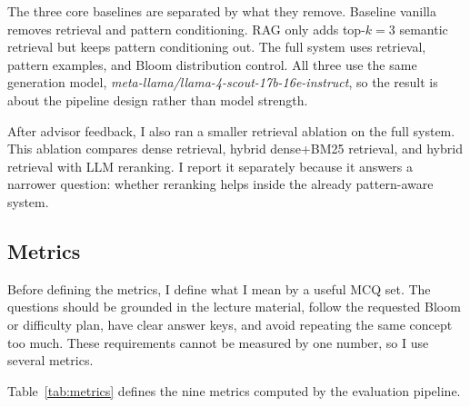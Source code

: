 \documentclass[12pt,a4paper]{article}
\begin{document}
The three core baselines are separated by what they remove. Baseline
vanilla removes retrieval and pattern conditioning. RAG only adds top-$k=3$
semantic retrieval but keeps pattern conditioning out. The full system uses
retrieval, pattern examples, and Bloom distribution control. All three use
the same generation model,
\textit{meta-llama/llama-4-scout-17b-16e-instruct}, so the result is about
the pipeline design rather than model strength.

After advisor feedback, I also ran a smaller retrieval ablation on the full
system. This ablation compares dense retrieval, hybrid dense+BM25 retrieval,
and hybrid retrieval with LLM reranking. I report it separately because it
answers a narrower question: whether reranking helps inside the already
pattern-aware system.

\subsection{Metrics}

Before defining the metrics, I define what I mean by a useful MCQ set. The
questions should be grounded in the lecture material, follow the requested
Bloom or difficulty plan, have clear answer keys, and avoid repeating the
same concept too much. These requirements cannot be measured by one number,
so I use several metrics.

Table~\ref{tab:metrics} defines the nine metrics computed by the
evaluation pipeline.
\end{document}
